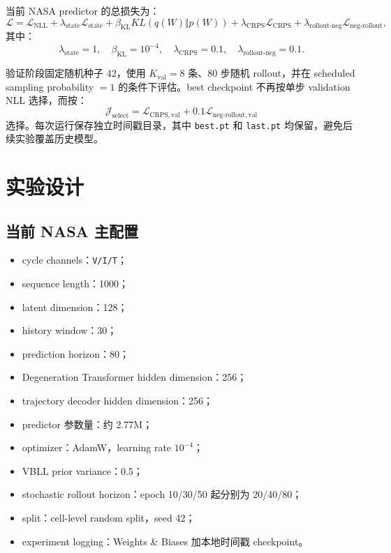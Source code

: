 \documentclass[11pt,a4paper,fontset=none]{ctexart}
\begin{document}
当前 NASA predictor 的总损失为：
\[
\mathcal L
=
\mathcal L_{\mathrm{NLL}}
+\lambda_{\mathrm{state}}\mathcal L_{\mathrm{state}}
+\beta_{\mathrm{KL}}KL(q(W)\Vert p(W))
+\lambda_{\mathrm{CRPS}}\mathcal L_{\mathrm{CRPS}}
+\lambda_{\mathrm{rollout\mbox{-}neg}}
\mathcal L_{\mathrm{neg\mbox{-}rollout}},
\]
其中：
\[
\lambda_{\mathrm{state}}=1,\quad
\beta_{\mathrm{KL}}=10^{-4},\quad
\lambda_{\mathrm{CRPS}}=0.1,\quad
\lambda_{\mathrm{rollout\mbox{-}neg}}=0.1.
\]

验证阶段固定随机种子 42，使用 $K_{\mathrm{val}}=8$ 条、80 步随机 rollout，并在 scheduled sampling probability $=1$ 的条件下评估。best checkpoint 不再按单步 validation NLL 选择，而按：
\[
\mathcal J_{\mathrm{select}}
=
\mathcal L_{\mathrm{CRPS,val}}
+0.1\mathcal L_{\mathrm{neg\mbox{-}rollout,val}}
\]
选择。每次运行保存独立时间戳目录，其中 \texttt{best.pt} 和 \texttt{last.pt} 均保留，避免后续实验覆盖历史模型。

\section{实验设计}

\subsection{当前 NASA 主配置}

\begin{itemize}
  \item cycle channels：\texttt{V/I/T}；
  \item sequence length：1000；
  \item latent dimension：128；
  \item history window：30；
  \item prediction horizon：80；
  \item Degeneration Transformer hidden dimension：256；
  \item trajectory decoder hidden dimension：256；
  \item predictor 参数量：约 2.77M；
  \item optimizer：AdamW，learning rate $10^{-4}$；
  \item VBLL prior variance：0.5；
  \item stochastic rollout horizon：epoch 10/30/50 起分别为 20/40/80；
  \item split：cell-level random split，seed 42；
  \item experiment logging：Weights \& Biases 加本地时间戳 checkpoint。
\end{itemize}
\end{document}
